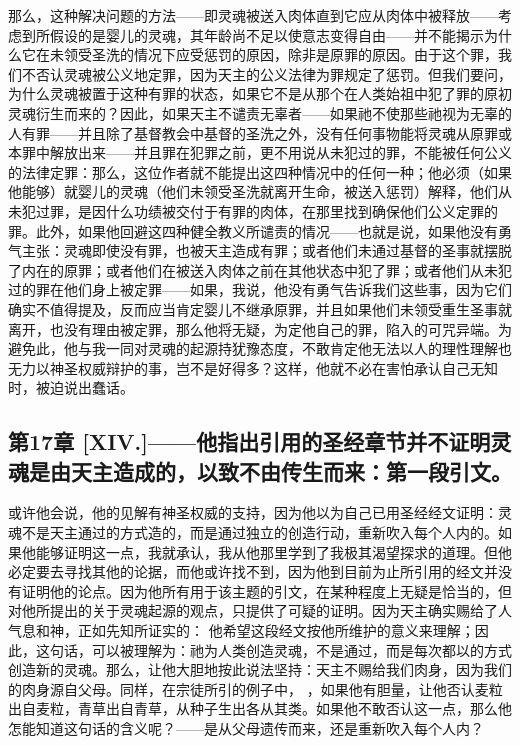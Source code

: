 那么，这种解决问题的方法——即灵魂被送入肉体直到它应从肉体中被释放——考虑到所假设的是婴儿的灵魂，其年龄尚不足以使意志变得自由——并不能揭示为什么它在未领受圣洗的情况下应受惩罚的原因，除非是原罪的原因。由于这个罪，我们不否认灵魂被公义地定罪，因为天主的公义法律为罪规定了惩罚。但我们要问，为什么灵魂被置于这种有罪的状态，如果它不是从那个在人类始祖中犯了罪的原初灵魂衍生而来的？因此，如果天主不谴责无辜者——如果祂不使那些祂视为无辜的人有罪——并且除了基督教会中基督的圣洗之外，没有任何事物能将灵魂从原罪或本罪中解放出来——并且罪在犯罪之前，更不用说从未犯过的罪，不能被任何公义的法律定罪：那么，这位作者就不能提出这四种情况中的任何一种；他必须（如果他能够）就婴儿的灵魂（他们未领受圣洗就离开生命，被送入惩罚）解释，他们从未犯过罪，是因什么功绩被交付于有罪的肉体，在那里找到确保他们公义定罪的罪。此外，如果他回避这四种健全教义所谴责的情况——也就是说，如果他没有勇气主张：灵魂即使没有罪，也被天主造成有罪；或者他们未通过基督的圣事就摆脱了内在的原罪；或者他们在被送入肉体之前在其他状态中犯了罪；或者他们从未犯过的罪在他们身上被定罪——如果，我说，他没有勇气告诉我们这些事，因为它们确实不值得提及，反而应当肯定婴儿不继承原罪，并且如果他们未领受重生圣事就离开，也没有理由被定罪，那么他将无疑，为定他自己的罪，陷入的可咒异端。为避免此，他与我一同对灵魂的起源持犹豫态度，不敢肯定他无法以人的理性理解也无力以神圣权威辩护的事，岂不是好得多？这样，他就不必在害怕承认自己无知时，被迫说出蠢话。\par


\subsection{第17章 [XIV.]——他指出引用的圣经章节并不证明灵魂是由天主造成的，以致不由传生而来：第一段引文。}

或许他会说，他的见解有神圣权威的支持，因为他以为自己已用圣经经文证明：灵魂不是天主通过的方式造的，而是通过独立的创造行动，重新吹入每个人内的。如果他能够证明这一点，我就承认，我从他那里学到了我极其渴望探求的道理。但他必定要去寻找其他的论据，而他或许找不到，因为他到目前为止所引用的经文并没有证明他的论点。因为他所有用于该主题的引文，在某种程度上无疑是恰当的，但对他所提出的关于灵魂起源的观点，只提供了可疑的证明。因为天主确实赐给了人气息和神，正如先知所证实的：  他希望这段经文按他所维护的意义来理解；因此，这句话，可以被理解为：祂为人类创造灵魂，不是通过，而是每次都以的方式创造新的灵魂。那么，让他大胆地按此说法坚持：天主不赐给我们肉身，因为我们的肉身源自父母。同样，在宗徒所引的例子中， ，如果他有胆量，让他否认麦粒出自麦粒，青草出自青草，从种子生出各从其类。如果他不敢否认这一点，那么他怎能知道这句话的含义呢？——是从父母遗传而来，还是重新吹入每个人内？\par

